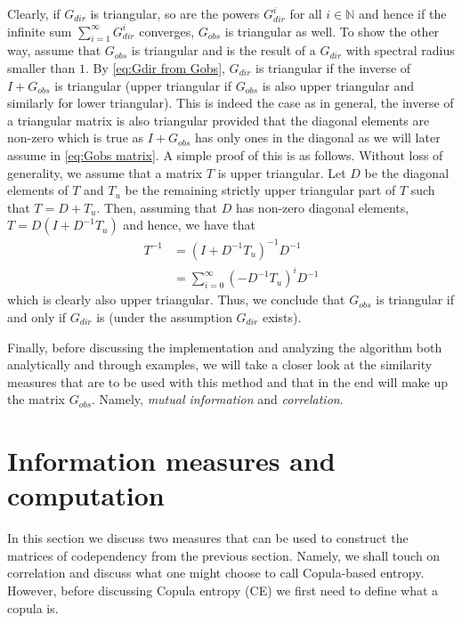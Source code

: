 \documentclass[../Thesis.tex]{subfiles}
\begin{document}
Clearly, if $G_{dir}$ is triangular, so are the powers $G_{dir}^i$ for all $i\in\mathbb{N}$ and hence if the infinite sum $\sum_{i=1}^{\infty} G_{dir}^{i}$ converges, $G_{obs}$ is triangular as well. To show the other way, assume that $G_{obs}$ is triangular and is the result of a $G_{dir}$ with spectral radius smaller than $1$. By \autoref{eq:Gdir from Gobs}, $G_{dir}$ is triangular if the inverse of $I + G_{obs}$ is triangular (upper triangular if $G_{obs}$ is also upper triangular and similarly for lower triangular). This is indeed the case as in general, the inverse of a triangular matrix is also triangular provided that the diagonal elements are non-zero which is true as $ I + G_{obs}$ has only ones in the diagonal as we will later assume in \autoref{eq:Gobs matrix}. A simple proof of this is as follows. Without loss of generality, we assume that a matrix $T$ is upper triangular. Let $D$ be the diagonal elements of $T$ and $T_u$ be the remaining strictly upper triangular part of $T$ such that $T = D + T_{u}$. Then, assuming that $D$ has non-zero diagonal elements, $T = D \left(I + D^{-1}T_u\right)$ and hence, we have that
\begin{align*}
    T^{-1} & = \left(I + D^{-1}T_u\right)^{-1} D^{-1}               \\
           & = \sum_{i=0}^\infty \left(- D^{-1} T_u\right)^i D^{-1}
\end{align*}
which is clearly also upper triangular. Thus, we conclude that $G_{obs}$ is triangular if and only if $G_{dir}$ is (under the assumption $G_{dir}$ exists).

Finally, before discussing the implementation and analyzing the algorithm both analytically and through examples, we will take a closer look at the similarity measures that are to be used with this method and that in the end will make up the matrix $G_{obs}$. Namely, \textit{mutual information} and \textit{correlation}.


\section{Information measures and computation}\label{seq:Information measures and computation}
In this section we discuss two measures that can be used to construct the matrices of codependency from the previous section. Namely, we shall touch on correlation and discuss what one might choose to call Copula-based entropy. However, before discussing Copula entropy (CE) we first need to define what a copula is.
\end{document}
